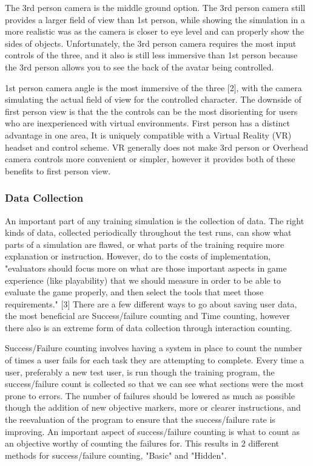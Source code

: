 \documentclass[onecolumn, draftclsnofoot,10pt, compsoc]{IEEEtran}
\newcounter{subsubsubsection}[subsubsection]
\begin{document}
The 3rd person camera is the middle ground option. The 3rd person camera still provides a larger field of view than 1st person, while showing the simulation in a more realistic was as the camera is closer to eye level and can properly show the sides of objects. Unfortunately, the 3rd person camera requires the most input controls of the three, and it also is still less immersive than 1st person because the 3rd person allows you to see the back of the avatar being controlled.  

1st person camera angle is the most immersive of the three [2], with the camera simulating the actual field of view for the controlled character. The downside of first person view is that the the controls can be the most disorienting for users who are inexperienced with virtual environments. First person has a distinct advantage in one area, It is uniquely compatible with a Virtual Reality (VR) headset and control scheme. VR generally does not make 3rd person or Overhead camera controls more convenient or simpler, however it provides both of these benefits to first person view. 


\subsubsection{Data Collection}
An important part of any training simulation is the collection of data. The right kinds of data, collected periodically throughout the test runs, can show what parts of a simulation are flawed, or what parts of the training require more explanation or instruction. However, do to the costs of implementation, "evaluators should focus more on what are those important aspects in game experience (like playability) that we should measure in order to be able to evaluate the game properly, and then select the tools that meet those requirements." [3] There are a few different ways to go about saving user data, the most beneficial are Success/failure counting and Time counting, however there also is an extreme form of data collection through interaction counting.

Success/Failure counting involves having a system in place to count the number of times a user fails for each task they are attempting to complete. Every time a user, preferably a new test user, is run though the training program, the success/failure count is collected so that we can see what sections were the most prone to errors. The number of failures should be lowered as much as possible though the addition of new objective markers, more or clearer instructions, and the reevaluation of the program to ensure that the success/failure rate is improving. An important aspect of success/failure counting is what to count as an objective worthy of counting the failures for. This results in 2 different methods for success/failure counting, "Basic" and "Hidden".
\end{document}
